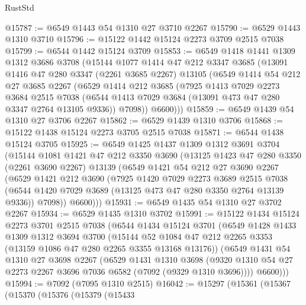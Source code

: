 \begin{lexlean}{RustStd}
\begin{coremodule}
@15787 := @6549 @1443 @54 @1310 @27 @3710 @2267
@15790 := @6529 @1443 @1310 @3710
@15796 := @15122 @1442 @15124 @2273 @3709 @2515 @7038
@15799 := @6544 @1442 @15124 @3709
@15853 := @6549
    @1418
    @1441
    @1309
    @1312
    @3686
    @3708
    (@15144
      @1077
      @1414
      @47
      @212
      @3347
      @3685
      (@13091
        @1416
        @47
        @280
        @3347
        (@2261 @3685 @2267)
        @13105
        (@6549
          @1414
          @54
          @212
          @27
          @3685
          @2267
          (@6529
            @1414
            @212
            @3685
            (@7925
              @1413
              @7029
              @2273
              @3684
              @2515
              @7038
              (@6544 @1413 @7029 @3684 (@13091 @473 @47 @280 @3347 @2764 @13105 @9336))
              @7098))
          @6600)))
@15859 := @6549 @1439 @54 @1310 @27 @3706 @2267
@15862 := @6529 @1439 @1310 @3706
@15868 := @15122 @1438 @15124 @2273 @3705 @2515 @7038
@15871 := @6544 @1438 @15124 @3705
@15925 := @6549
    @1425
    @1437
    @1309
    @1312
    @3691
    @3704
    (@15144
      @1081
      @1421
      @47
      @212
      @3350
      @3690
      (@13125
        @1423
        @47
        @280
        @3350
        (@2261 @3690 @2267)
        @13139
        (@6549
          @1421
          @54
          @212
          @27
          @3690
          @2267
          (@6529
            @1421
            @212
            @3690
            (@7925
              @1420
              @7029
              @2273
              @3689
              @2515
              @7038
              (@6544 @1420 @7029 @3689 (@13125 @473 @47 @280 @3350 @2764 @13139 @9336))
              @7098))
          @6600)))
@15931 := @6549 @1435 @54 @1310 @27 @3702 @2267
@15934 := @6529 @1435 @1310 @3702
@15991 := @15122
    @1434
    @15124
    @2273
    @3701
    @2515
    @7038
    (@6544
      @1434
      @15124
      @3701
      (@6549
        @1428
        @1433
        @1309
        @1312
        @3694
        @3700
        (@15144 @52 @1084 @47 @212 @2265 @3353 (@13159 @1086 @47 @280 @2265 @3355 @13168 @13176))
        (@6549
          @1431
          @54
          @1310
          @27
          @3698
          @2267
          (@6529
            @1431
            @1310
            @3698
            (@9320 @1310 @54 @27 @2273 @2267 @3696 @7036 @6582 (@7092 (@9329 @1310 @3696))))
          @6600)))
@15994 := @7092 (@7095 @1310 @2515)
@16042 := @15297
    (@15361
      (@15367
        (@15370
          (@15376
            (@15379
              (@15433

\end{coremodule}
\end{lexlean}
